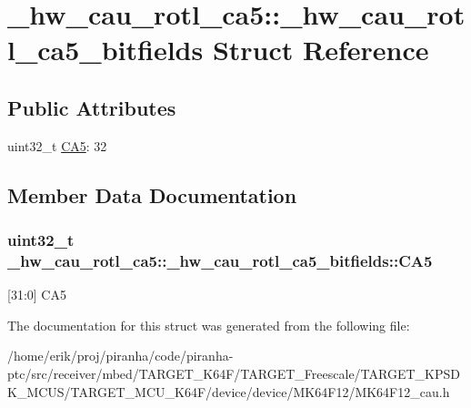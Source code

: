 \hypertarget{struct__hw__cau__rotl__ca5_1_1__hw__cau__rotl__ca5__bitfields}{}\section{\+\_\+hw\+\_\+cau\+\_\+rotl\+\_\+ca5\+:\+:\+\_\+hw\+\_\+cau\+\_\+rotl\+\_\+ca5\+\_\+bitfields Struct Reference}
\label{struct__hw__cau__rotl__ca5_1_1__hw__cau__rotl__ca5__bitfields}
\subsection*{Public Attributes}
\begin{DoxyCompactItemize}
\item 
uint32\+\_\+t \hyperlink{struct__hw__cau__rotl__ca5_1_1__hw__cau__rotl__ca5__bitfields_a9c3efca234ba0afb01c00d33eaefc882}{C\+A5}\+: 32
\end{DoxyCompactItemize}


\subsection{Member Data Documentation}
\subsubsection[{\texorpdfstring{C\+A5}{CA5}}]{\setlength{\rightskip}{0pt plus 5cm}uint32\+\_\+t \+\_\+hw\+\_\+cau\+\_\+rotl\+\_\+ca5\+::\+\_\+hw\+\_\+cau\+\_\+rotl\+\_\+ca5\+\_\+bitfields\+::\+C\+A5}\hypertarget{struct__hw__cau__rotl__ca5_1_1__hw__cau__rotl__ca5__bitfields_a9c3efca234ba0afb01c00d33eaefc882}{}\label{struct__hw__cau__rotl__ca5_1_1__hw__cau__rotl__ca5__bitfields_a9c3efca234ba0afb01c00d33eaefc882}
\mbox{[}31\+:0\mbox{]} C\+A5 

The documentation for this struct was generated from the following file\+:\begin{DoxyCompactItemize}
\item 
/home/erik/proj/piranha/code/piranha-\/ptc/src/receiver/mbed/\+T\+A\+R\+G\+E\+T\+\_\+\+K64\+F/\+T\+A\+R\+G\+E\+T\+\_\+\+Freescale/\+T\+A\+R\+G\+E\+T\+\_\+\+K\+P\+S\+D\+K\+\_\+\+M\+C\+U\+S/\+T\+A\+R\+G\+E\+T\+\_\+\+M\+C\+U\+\_\+\+K64\+F/device/device/\+M\+K64\+F12/M\+K64\+F12\+\_\+cau.\+h\end{DoxyCompactItemize}
